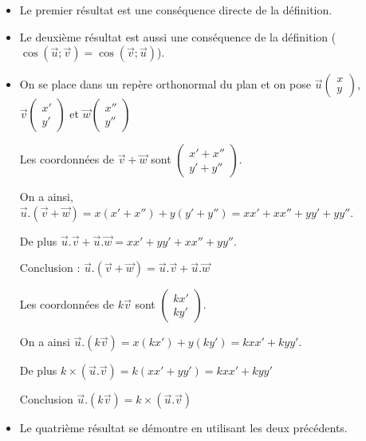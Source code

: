 \documentclass[french]{book}
\newcommand{\vect}[1]{\overrightarrow{#1}}
\newcommand{\cp}[2]{%
        \begin{pmatrix}
        #1\\
        #2
        \end{pmatrix}%
        }
\begin{document}
\begin{demo}
\begin{itemize}
\item[$\bullet$] Le premier r\'esultat est une cons\'equence directe de la d\'efinition.
\item[$\bullet$] Le deuxi\`eme r\'esultat est aussi une cons\'equence de la d\'efinition ($\cos(\vect{u};\vect{v})=\cos(\vect{v};\vect{u})$).
\item[$\bullet$] On se place dans un rep\`ere orthonormal du plan et on pose $\vect{u}\cp{x}{y}$, $\vect{v}\cp{x'}{y'}$ et $\vect{w}\cp{x''}{y''}$

Les coordonn\'ees de $\vect{v}+\vect{w}$ sont $\cp{x'+x''}{y'+y''}$.

On a ainsi, $\vect{u}.(\vect{v}+\vect{w})=x(x'+x'')+y(y'+y'')=xx'+xx''+yy'+yy''$.

De plus $\vect{u}.\vect{v}+\vect{u}.\vect{w}=xx'+yy'+xx''+yy''$.

Conclusion : $\vect{u}.(\vect{v}+\vect{w})=\vect{u}.\vect{v}+\vect{u}.\vect{w}$

Les coordonn\'ees de $k\vect{v}$ sont $\cp{kx'}{ky'}$.

On a ainsi $\vect{u}.(k\vect{v}) = x(kx')  + y(ky') = kxx'  + kyy'$.

De plus $k\times (\vect{u}.\vect{v})=k(xx'+yy')=kxx'+kyy'$

Conclusion $\vect{u}.(k\vect{v})=k\times (\vect{u}.\vect{v})$

\item[$\bullet$] Le quatri\`eme r\'esultat se d\'emontre en utilisant les deux pr\'ec\'edents.
\end{itemize}
\end{demo}
\end{document}
